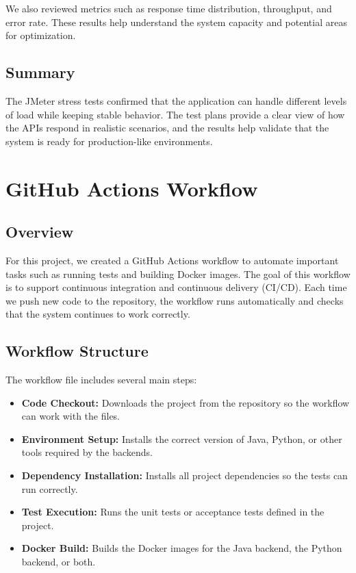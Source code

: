 \documentclass[12pt,a4paper]{article}
\begin{document}
We also reviewed metrics such as response time distribution, throughput, and error rate. These results help understand the system capacity and potential areas for optimization.

\subsection{Summary}

The JMeter stress tests confirmed that the application can handle different levels of load while keeping stable behavior. The test plans provide a clear view of how the APIs respond in realistic scenarios, and the results help validate that the system is ready for production-like environments.

\section{GitHub Actions Workflow}

\subsection{Overview}

For this project, we created a GitHub Actions workflow to automate important tasks such as running tests and building Docker images. The goal of this workflow is to support continuous integration and continuous delivery (CI/CD). Each time we push new code to the repository, the workflow runs automatically and checks that the system continues to work correctly.

\subsection{Workflow Structure}

The workflow file includes several main steps:

\begin{itemize}
	\item \textbf{Code Checkout:} Downloads the project from the repository so the workflow can work with the files.
	\item \textbf{Environment Setup:} Installs the correct version of Java, Python, or other tools required by the backends.
	\item \textbf{Dependency Installation:} Installs all project dependencies so the tests can run correctly.
	\item \textbf{Test Execution:} Runs the unit tests or acceptance tests defined in the project.
	\item \textbf{Docker Build:} Builds the Docker images for the Java backend, the Python backend, or both.
\end{itemize}
\end{document}

